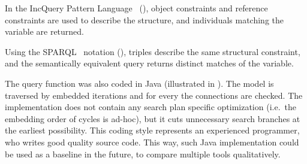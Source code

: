 % 
% 
% 

In the IncQuery Pattern Language~\cite{IQlanguage} (), object constraints and reference constraints are used to describe the structure, and individuals matching the  variable are returned.

Using the SPARQL~\cite{Sparql} notation (), triples describe the same structural constraint, and the semantically equivalent query returns distinct matches of the  variable.

The query function was also coded in Java (illustrated in ). The model is traversed by embedded iterations and for every  the connections are checked. The implementation does not contain any search plan specific optimization (i.e.\ the embedding order of  cycles is ad-hoc), but it cuts unnecessary search branches at the earliest possibility.  This coding style represents an experienced programmer, who writes good quality source code. This way, such Java implementation could be used as a baseline in the future, to compare multiple tools qualitatively.



